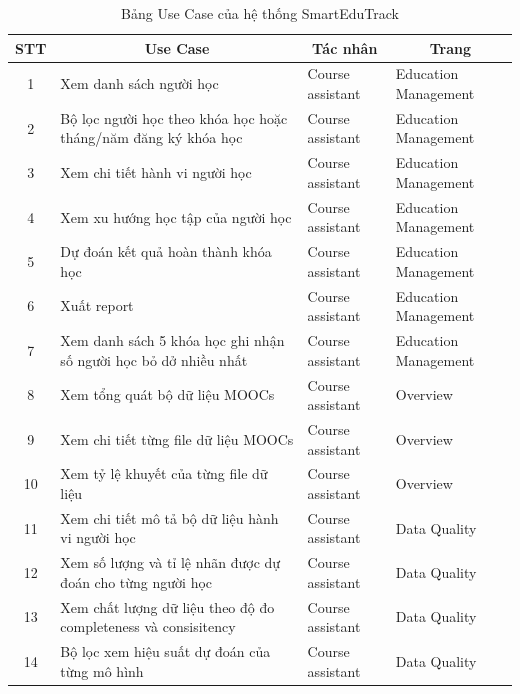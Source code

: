 \begin{table}[H]
\centering
\caption{Bảng Use Case của hệ thống SmartEduTrack}
\label{tab:usecase}
\renewcommand{\arraystretch}{1.2} %
\begin{tabular}{|c|p{5cm}|p{3cm}|p{4.5cm}|}
\hline
\multicolumn{1}{|c|}{\textbf{STT}} & \multicolumn{1}{c|}{\textbf{Use Case}} & \multicolumn{1}{c|}{\textbf{Tác nhân}} & \multicolumn{1}{c|}{\textbf{Trang}} \\
\hline
1 & Xem danh sách người học & Course assistant & Education Management \\
\hline
2 & Bộ lọc người học theo khóa học hoặc tháng/năm đăng ký khóa học & Course assistant & Education Management \\
\hline
3 & Xem chi tiết hành vi người học & Course assistant & Education Management \\
\hline
4 & Xem xu hướng học tập của người học & Course assistant & Education Management \\
\hline
5 & Dự đoán kết quả hoàn thành khóa học & Course assistant & Education Management \\
\hline
6 & Xuất report & Course assistant & Education Management \\
\hline
7 & Xem danh sách 5 khóa học ghi nhận số người học bỏ dở nhiều nhất & Course assistant & Education Management \\
\hline
8 & Xem tổng quát bộ dữ liệu MOOCs & Course assistant & Overview \\
\hline
9 & Xem chi tiết từng file dữ liệu MOOCs & Course assistant & Overview \\
\hline
10 & Xem tỷ lệ khuyết của từng file dữ liệu & Course assistant & Overview \\
\hline
11 & Xem chi tiết mô tả bộ dữ liệu hành vi người học & Course assistant & Data Quality \\
\hline
12 & Xem số lượng và tỉ lệ nhãn được dự đoán cho từng người học & Course assistant & Data Quality \\
\hline
13 & Xem chất lượng dữ liệu theo độ đo completeness và consisitency & Course assistant & Data Quality \\
\hline
14 & Bộ lọc xem hiệu suất dự đoán của từng mô hình & Course assistant & Data Quality \\
\hline
\end{tabular}
\end{table}


